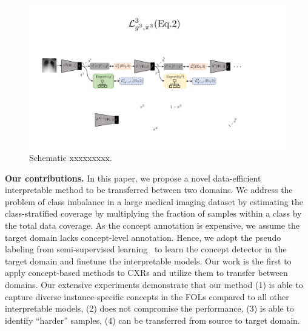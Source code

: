 \begin{figure}[ht]
\begin{center}
\includegraphics[width=\linewidth]{plots/main/Schematic.pdf}
\caption{Schematic xxxxxxxxx. }
\label{fig:qual}
\end{center}
\end{figure}


\textbf{Our contributions.}
 In this paper, we propose a novel data-efficient interpretable method to be transferred between two domains. We address the problem of class imbalance in a large medical imaging dataset by estimating the class-stratified coverage by multiplying the fraction of samples within a class by the total data coverage. As the concept annotation is expensive, we assume the target domain lacks concept-level annotation. Hence, we adopt the pseudo labeling from semi-supervised learning~\cite{lee2013pseudo} to learn the concept detector in the target domain and finetune the interpretable models. Our work is the first to apply concept-based methods to CXRs and utilize them to transfer between domains. 
 Our extensive experiments demonstrate that our method (1) is able to capture diverse instance-specific concepts in the FOLs compared to all other interpretable models, (2) does not compromise the performance, (3) is able to identify  ``harder'' samples, (4) can be transferred from source to target domain.
 
